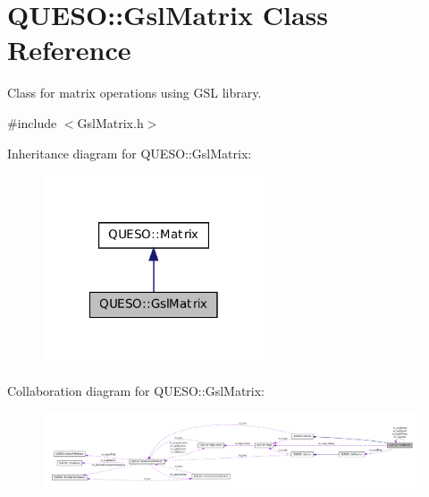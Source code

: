 \hypertarget{class_q_u_e_s_o_1_1_gsl_matrix}{\section{Q\-U\-E\-S\-O\-:\-:Gsl\-Matrix Class Reference}
\label{class_q_u_e_s_o_1_1_gsl_matrix}
}


Class for matrix operations using G\-S\-L library.  




{\ttfamily \#include $<$Gsl\-Matrix.\-h$>$}



Inheritance diagram for Q\-U\-E\-S\-O\-:\-:Gsl\-Matrix\-:
\nopagebreak
\begin{figure}[H]
\begin{center}
\leavevmode
\includegraphics[width=186pt]{class_q_u_e_s_o_1_1_gsl_matrix__inherit__graph}
\end{center}
\end{figure}


Collaboration diagram for Q\-U\-E\-S\-O\-:\-:Gsl\-Matrix\-:
\nopagebreak
\begin{figure}[H]
\begin{center}
\leavevmode
\includegraphics[width=350pt]{class_q_u_e_s_o_1_1_gsl_matrix__coll__graph}
\end{center}
\end{figure}
